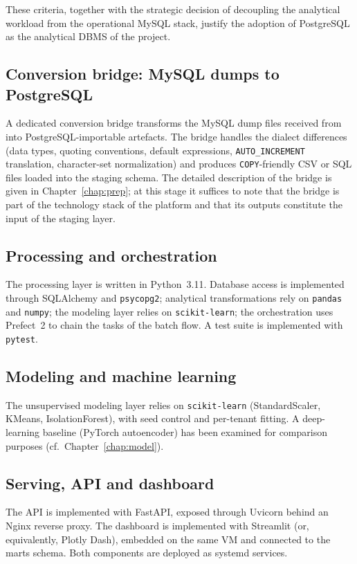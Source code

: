 These criteria, together with the strategic decision of decoupling the analytical workload from the operational MySQL stack, justify the adoption of PostgreSQL as the analytical DBMS of the project.

\subsection{Conversion bridge: MySQL dumps to PostgreSQL}
A dedicated conversion bridge transforms the MySQL dump files received from \hostorg{} into PostgreSQL-importable artefacts. The bridge handles the dialect differences (data types, quoting conventions, default expressions, \texttt{AUTO\_INCREMENT} translation, character-set normalization) and produces \texttt{COPY}-friendly CSV or SQL files loaded into the staging schema. The detailed description of the bridge is given in Chapter~\ref{chap:prep}; at this stage it suffices to note that the bridge is part of the technology stack of the platform and that its outputs constitute the input of the staging layer.

\subsection{Processing and orchestration}
The processing layer is written in Python~3.11. Database access is implemented through SQLAlchemy and \texttt{psycopg2}; analytical transformations rely on \texttt{pandas} and \texttt{numpy}; the modeling layer relies on \texttt{scikit-learn}; the orchestration uses Prefect~2 to chain the tasks of the batch flow. A test suite is implemented with \texttt{pytest}.

\subsection{Modeling and machine learning}
The unsupervised modeling layer relies on \texttt{scikit-learn} (StandardScaler, KMeans, IsolationForest), with seed control and per-tenant fitting. A deep-learning baseline (PyTorch autoencoder) has been examined for comparison purposes (cf.\ Chapter~\ref{chap:model}).

\subsection{Serving, API and dashboard}
The API is implemented with FastAPI, exposed through Uvicorn behind an Nginx reverse proxy. The dashboard is implemented with Streamlit (or, equivalently, Plotly Dash), embedded on the same VM and connected to the marts schema. Both components are deployed as systemd services.

